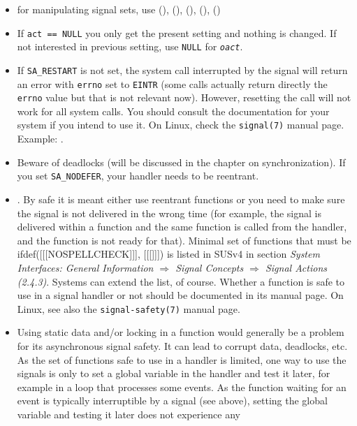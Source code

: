 \begin{itemize}
\item for manipulating signal sets, use (),
(), (), (),
()
\item If \texttt{act == NULL} you only get the present setting and nothing is
changed.  If not interested in previous setting, use \texttt{NULL} for
\emph{\texttt{oact}}.
\item If \texttt{SA\_RESTART} is not set, the system call interrupted by the
signal will return an error with \texttt{errno} set to \texttt{EINTR} (some
calls actually return directly the \texttt{errno} value but that is not relevant
now).  However, resetting the call will not work for all system calls.  You
should consult the documentation for your system if you intend to use it.
On Linux, check the \texttt{signal(7)} manual page.  Example:
.
\item Beware of deadlocks (will be discussed in the chapter on synchronization).
If you set \texttt{SA\_NODEFER}, your handler needs to be reentrant.
\item \label{ASYNCSIGNALSAFE} .  By safe it is meant either use reentrant functions or you need
to make sure the signal is not delivered in the wrong time (for example, the
signal is delivered within a function and the same function is called from the
handler, and the function is not ready for that).  Minimal set of functions
that must be ifdef([[[NOSPELLCHECK]]], [[[]]])
is listed in SUSv4 in section \emph{System Interfaces: General Information
$\Rightarrow$ Signal Concepts $\Rightarrow$ Signal Actions (2.4.3)}.  Systems
can extend the list, of course.  Whether a function is safe to use in a signal
handler or not should be documented in its manual page.  On Linux, see also
the \texttt{signal-safety(7)} manual page.
\item Using static data and/or locking in a function would generally be a
problem for its asynchronous signal safety.  It can lead to corrupt data,
deadlocks, etc.  As the set of functions safe to use in a handler is limited,
one way to use the signals is only to set a global variable in the handler and
test it later, for example in a loop that processes some events.  As the
function waiting for an event is typically interruptible by a signal (see
above), setting the global variable and testing it later does not experience any

\end{itemize}
